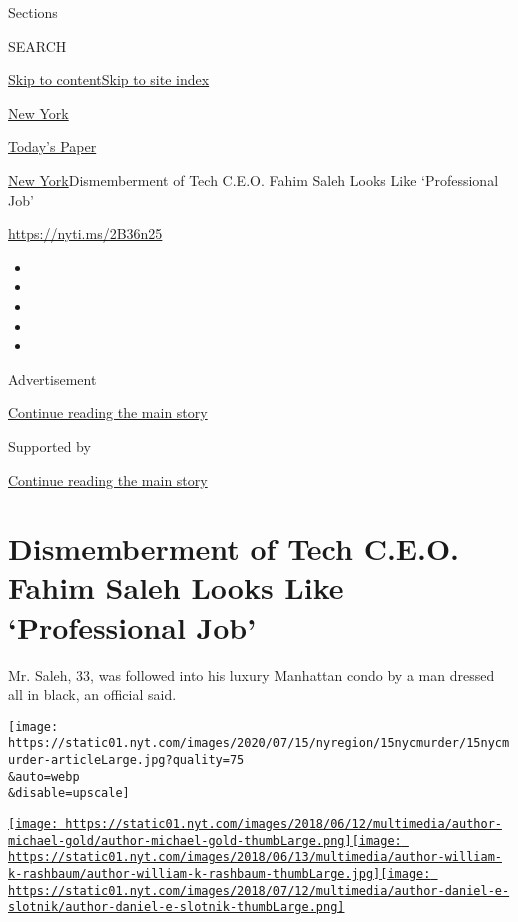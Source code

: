Sections

SEARCH

\protect\hyperlink{site-content}{Skip to
content}\protect\hyperlink{site-index}{Skip to site index}

\href{https://www.nytimes.com/section/nyregion}{New York}

\href{https://myaccount.nytimes.com/auth/login?response_type=cookie\&client_id=vi}{}

\href{https://www.nytimes.com/section/todayspaper}{Today's Paper}

\href{/section/nyregion}{New York}\textbar{}Dismemberment of Tech C.E.O.
Fahim Saleh Looks Like `Professional Job'

\url{https://nyti.ms/2B36n25}

\begin{itemize}
\item
\item
\item
\item
\item
\end{itemize}

Advertisement

\protect\hyperlink{after-top}{Continue reading the main story}

Supported by

\protect\hyperlink{after-sponsor}{Continue reading the main story}

\hypertarget{dismemberment-of-tech-ceo-fahim-saleh-looks-like-professional-job}{%
\section{Dismemberment of Tech C.E.O. Fahim Saleh Looks Like
`Professional
Job'}\label{dismemberment-of-tech-ceo-fahim-saleh-looks-like-professional-job}}

Mr. Saleh, 33, was followed into his luxury Manhattan condo by a man
dressed all in black, an official said.

\texttt{[image: https://static01.nyt.com/images/2020/07/15/nyregion/15nycmurder/15nycmurder-articleLarge.jpg?quality=75\\\&auto=webp\\\&disable=upscale]}

\href{https://www.nytimes.com/by/michael-gold}{\texttt{[image: https://static01.nyt.com/images/2018/06/12/multimedia/author-michael-gold/author-michael-gold-thumbLarge.png]}}\href{https://www.nytimes.com/by/william-k-rashbaum}{\texttt{[image: https://static01.nyt.com/images/2018/06/13/multimedia/author-william-k-rashbaum/author-william-k-rashbaum-thumbLarge.jpg]}}\href{https://www.nytimes.com/by/daniel-e-slotnik}{\texttt{[image: https://static01.nyt.com/images/2018/07/12/multimedia/author-daniel-e-slotnik/author-daniel-e-slotnik-thumbLarge.png]}}

